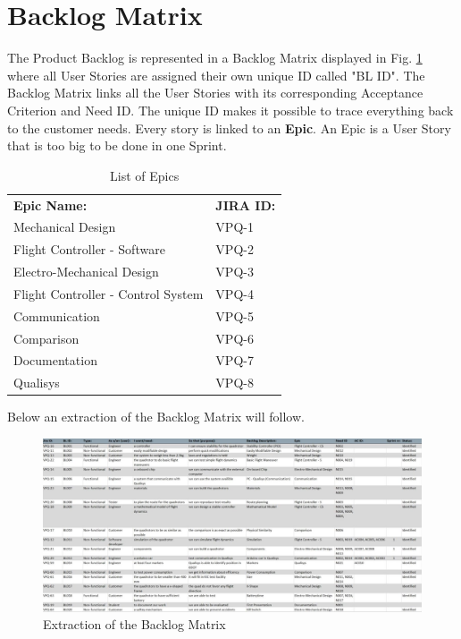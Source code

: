 \section{Backlog Matrix}
The Product Backlog is represented in a Backlog Matrix displayed in Fig. \ref{fig:backlog} where all User Stories are assigned their own unique ID called "BL ID". The Backlog Matrix links all the User Stories with its corresponding Acceptance Criterion and Need ID. The unique ID makes it possible to trace everything back to the customer needs. Every story is linked to an \textbf{Epic}. An Epic is a User Story that is too big to be done in one Sprint.

\begin{table}[h]
\begin{center}
\caption{List of Epics}
\begin{tabular}{l|l}
     \rowcolor{cadetgrey} \textbf{Epic Name:}      & \textbf{JIRA ID:} \\
                        Mechanical Design                       & VPQ-1 \\  
\rowcolor{gainsboro}    Flight Controller - Software            & VPQ-2 \\  
                        Electro-Mechanical Design               & VPQ-3 \\  
\rowcolor{gainsboro}    Flight Controller - Control System      & VPQ-4 \\  
                        Communication                           & VPQ-5 \\  
\rowcolor{gainsboro}    Comparison                              & VPQ-6 \\  
                        Documentation                           & VPQ-7 \\  
\rowcolor{gainsboro}    Qualisys                                & VPQ-8 \\ 
                           
\end{tabular}
\end{center}
\end{table}
\bigskip
Below an extraction of the Backlog Matrix will follow.
\begin{figure}[h]
    \centering
        \includegraphics[width = 1\textwidth]{VAPIQ-PICTURES/BacklogMatrix}
    \caption{Extraction of the Backlog Matrix}
    \label{fig:backlog}
\end{figure}

